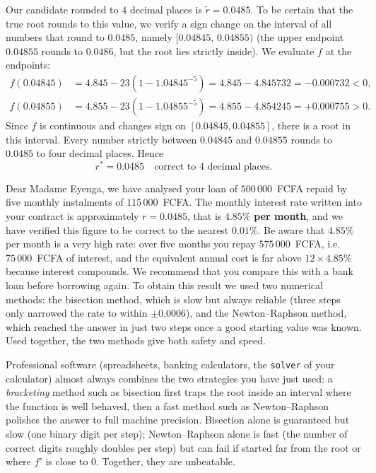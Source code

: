 \documentclass[11pt]{article}
\newcounter{popsec}
\newcounter{popsub}
\newcommand{\courssub}[1]{%
  \stepcounter{popsub}%
  \par\vspace{9pt}\noindent{\popxbold\fontsize{11.5}{13}\selectfont\color{popink}{\color{poporange}\thepopsec.\thepopsub}\hspace{6pt}#1}\par\nopagebreak\vspace{4pt}
}
\begin{document}
\begin{exoresolu}
Our candidate rounded to $4$ decimal places is $\tilde{r}=0.0485$. To be certain that the true root rounds to this value, we verify a sign change on the interval of all numbers that round to $0.0485$, namely $[0.04845,\,0.04855)$ (the upper endpoint $0.04855$ rounds to $0.0486$, but the root lies strictly inside). We evaluate $f$ at the endpoints:
\begin{align*}
f(0.04845) &= 4.845 - 23\left(1-1.04845^{-5}\right) = 4.845 - 4.845732 = -0.000732 < 0,\\
f(0.04855) &= 4.855 - 23\left(1-1.04855^{-5}\right) = 4.855 - 4.854245 = +0.000755 > 0.
\end{align*}
Since $f$ is continuous and changes sign on $[0.04845,0.04855]$, there is a root in this interval. Every number strictly between $0.04845$ and $0.04855$ rounds to $0.0485$ to four decimal places. Hence
\[ \boxed{r^{*}=0.0485 \quad\text{correct to }4\text{ decimal places.}} \]
\end{exoresolu}

\courssub{Advisory Note}

\begin{aretenir}
Dear Madame Eyenga, we have analysed your loan of $500\,000$~FCFA repaid by five monthly instalments of $115\,000$~FCFA. The monthly interest rate written into your contract is approximately $r=0.0485$, that is $\mathbf{4.85\%}$ \textbf{per month}, and we have verified this figure to be correct to the nearest $0.01\%$. Be aware that $4.85\%$ per month is a very high rate: over five months you repay $575\,000$~FCFA, i.e. $75\,000$~FCFA of interest, and the equivalent annual cost is far above $12\times4.85\%$ because interest compounds. We recommend that you compare this with a bank loan before borrowing again. To obtain this result we used two numerical methods: the bisection method, which is slow but always reliable (three steps only narrowed the rate to within $\pm0.0006$), and the Newton--Raphson method, which reached the answer in just two steps once a good starting value was known. Used together, the two methods give both safety and speed.
\end{aretenir}

\begin{savaistu}
Professional software (spreadsheets, banking calculators, the \texttt{solver} of your calculator) almost always combines the two strategies you have just used: a \emph{bracketing} method such as bisection first traps the root inside an interval where the function is well behaved, then a fast method such as Newton--Raphson polishes the answer to full machine precision. Bisection alone is guaranteed but slow (one binary digit per step); Newton--Raphson alone is fast (the number of correct digits roughly doubles per step) but can fail if started far from the root or where $f'$ is close to $0$. Together, they are unbeatable.
\end{savaistu}
\end{document}

